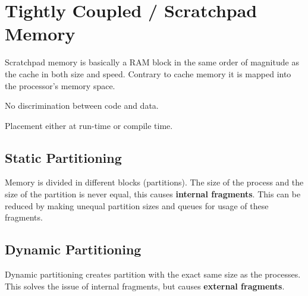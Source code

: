 \section{Tightly Coupled / Scratchpad Memory }
	Scratchpad memory is basically a RAM block in the same order of magnitude as the cache in both size and speed. Contrary to cache memory it is mapped into the processor's memory space.
	
	\begin{compactitem}
	  \item No discrimination between code and data.
	  \item Placement either at run-time or compile time.
	\end{compactitem}
	
	\subsection{Static Partitioning }
		Memory is divided in different blocks (partitions). The size of the process and the size of the partition is never equal, this causes \textbf{internal fragments}. This can be reduced by making unequal partition sizes and queues for usage of these fragments. 
	\subsection{Dynamic Partitioning }
		Dynamic partitioning creates partition with the exact same size as the processes. This solves the issue of internal fragments, but causes \textbf{external fragments}.
			
